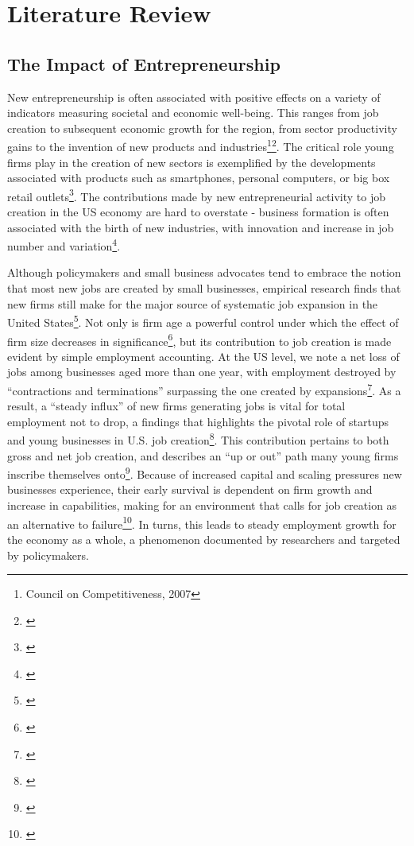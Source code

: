 
\chapter{Literature Review\label{ch:pastwork}}

\section{The Impact of Entrepreneurship}

New entrepreneurship is often associated with positive effects on a variety of indicators measuring societal and economic well-being. This ranges from job creation to subsequent economic growth for the region, from sector productivity gains to the invention of new products and industries\footnote{Council on Competitiveness, 2007}\hspace{.15em}\footnote{\cite{Reynolds2007}}. The critical role young firms play in the creation of new sectors is exemplified by the developments associated with products such as smartphones, personal computers, or big box retail outlets\footnote{\cite{GartnerShaverCarterReynolds2004}}. The contributions made by new entrepreneurial activity to job creation in the US economy are hard to overstate - business formation is often associated with the birth of new industries, with innovation and increase in job number and variation\footnote{\cite{ReynoldsWhite1997}}. 

Although policymakers and small business advocates tend to embrace the notion that most new jobs are created by small businesses, empirical research finds that new firms still make for the major source of systematic job expansion in the United States\footnote{\cite{AcsArmington2004}}. Not only is firm age a powerful control under which the effect of firm size decreases in significance\footnote{\cite{HaltiwangerJarminMiranda2013}}, but its contribution to job creation is made evident by simple employment accounting. At the US level, we note a net loss of jobs among businesses aged more than one year, with employment destroyed by “contractions and terminations” surpassing the one created by expansions\footnote{\cite{AcsArmington2004}}. As a result, a “steady influx” of new firms generating jobs is vital for total employment not to drop, a findings that highlights the pivotal role of startups and young businesses in U.S. job creation\footnote{\cite{AcsArmington2004}}. This contribution pertains to both gross and net job creation, and describes an “up or out” path many young firms inscribe themselves onto\footnote{\cite{AcsArmington2004}}. Because of increased capital and scaling pressures new businesses experience, their early survival is dependent on firm growth and increase in capabilities, making for an environment that calls for job creation as an alternative to failure\footnote{\cite{AcsArmington2004}}. In turns, this leads to steady employment growth for the economy as a whole, a phenomenon documented by researchers and targeted by policymakers.

